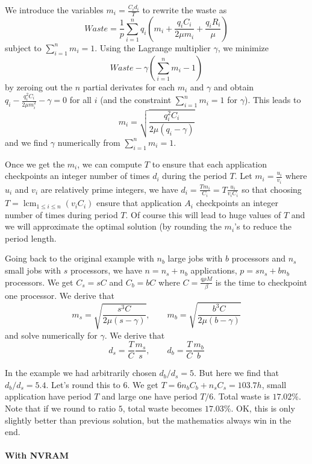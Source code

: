 \documentclass{article}
\DeclareMathOperator{\lcm}{lcm}
\begin{document}
We introduce the variables $m_{i} = \frac{C_{i} d_{i}}{T}$ to rewrite the waste as
$$Waste = \frac{1}{p} \sum_{i=1}^{n} q_{i} (m_{i}+ \frac{q_{i}C_{i}}{2 \mu m_{i}} +\frac{q_{i} R_{i}}{\mu})$$
subject to $\sum_{i=1}^{n} m_{i} = 1$.
Using the Lagrange multiplier $\gamma$, we minimize
$$Waste - \gamma (\sum_{i=1}^{n} m_{i} - 1)$$
by zeroing out the $n$ partial derivates for each $m_{i}$ and $\gamma$ and obtain
$q_{i} - \frac{q_{i}^{2} C_{i}}{2 \mu m_{i}^{2}} - \gamma = 0$ for all $i$ (and the constraint
$\sum_{i=1}^{n} m_{i} = 1$ for $\gamma$). This leads to 
$$m_{i} = \sqrt{\frac{q_{i}^{2} C_{i}}{2 \mu (q_{i} - \gamma)}}$$
and we find $\gamma$ numerically from $\sum_{i=1}^{n} m_{i} = 1$.

Once we get the $m_{i}$, we can compute $T$ to ensure that each application checkpoints an integer number of times $d_{i}$ during the period $T$. Let $m_{i} = \frac{u_{i}}{v_{i}}$
where $u_{i}$ and $v_{i}$ are relatively prime integers, we have 
$d_{i} = \frac{T m_{i}}{C_{i}} = T \frac{u_{i}}{v_{i} C_{i}}$
so that choosing $T = \lcm_{1 \leq i \leq n}(v_{i} C_{i})$ ensure that application $A_{i}$ checkpoints an integer number of times during period $T$. Of course this will lead to huge values of $T$
and we will approximate the optimal solution (by rounding the $m_{i}$'s to 
reduce the period length.

Going back to the original example with $n_{b}$ large jobs with $b$ processors
and $n_{s}$ small jobs with $s$ processors,
we have $n = n_{s} + n_{b}$ applications, $p =  s n_{s} + b n_{b}$ processors. We get
$C_{s} = s C$ and $C_{b} = b C$ where $C = \frac{q\rho M}{\beta}$ is the time to checkpoint one processor. We derive that 
$$m_{s} = \sqrt{\frac{s^{3} C}{2 \mu (s - \gamma)}}, \qquad m_{b} = \sqrt{\frac{b^{3} C}{2 \mu (b - \gamma)}}$$
and solve numerically for $\gamma$. We derive that
$$d_{s} = \frac{T}{C} \frac{m_{s}}{s}, \qquad d_{b} = \frac{T}{C} \frac{m_{b}}{b}$$

In the example we had arbitrarily chosen $d_{b}/d_{s}=5$.
But here we find that $d_{b}/d_{s}=5.4$. Let's round this to $6$.
We get $T=6n_{b}C_{b}+n_{s}C_{s}=103.7h$, small application have period $T$
and large one have period $T/6$.  Total waste is $17.02\%$.
Note that if we round to ratio $5$, total waste becomes $17.03\%$.
OK, this is only slightly better than previous solution, but the mathematics 
 always win in the end.

\paragraph{With NVRAM}
\end{document}
